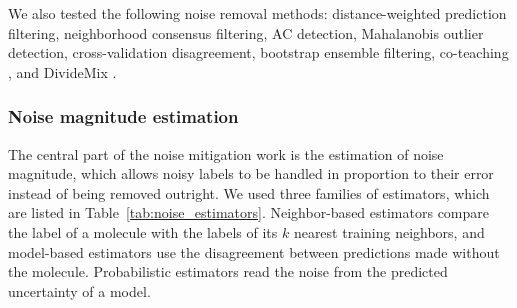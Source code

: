 We also tested the following noise removal methods:  distance-weighted prediction filtering, neighborhood consensus filtering, AC detection, Mahalanobis outlier detection, cross-validation disagreement, bootstrap ensemble filtering, co-teaching \citep{Han2018}, and DivideMix \citep{li2020}.

\subsubsection{Noise magnitude estimation}

The central part of the noise mitigation work is the estimation of noise magnitude, which allows noisy labels to be handled in proportion to their error instead of being removed outright. We used three families of estimators, which are listed in Table~\ref{tab:noise_estimators}. Neighbor-based estimators compare the label of a molecule with the labels of its $k$ nearest training neighbors, and model-based estimators use the disagreement between predictions made without the molecule. Probabilistic estimators read the noise from the predicted uncertainty of a model.

